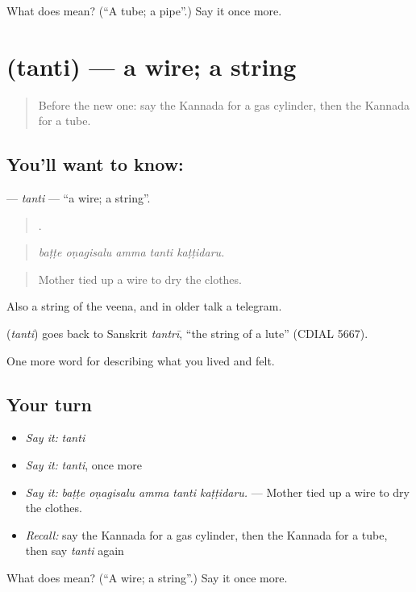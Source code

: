 \begin{tcolorbox}[breakable,colback=teal!4,colframe=teal!35!black,title={Before you move on}]
What does  mean? (\textquotedblleft{}A tube; a pipe\textquotedblright{}.) Say it once more.
\end{tcolorbox}
\section[\texorpdfstring{\kn{ತಂತಿ} (tanti)}{ತಂತಿ (tanti)}]{ (tanti) — a wire; a string}

\label{lesson:KA-C544-tanti}



\begin{quote}
Before the new one: say the Kannada for a gas cylinder, then the Kannada for a tube.
\end{quote}

\subsection*{You'll want to know: }
\textbf{} — \emph{tanti} — \textquotedblleft{}a wire; a string\textquotedblright{}.

\begin{quote}
    .
\end{quote}

\begin{quote}
\emph{baṭṭe oṇagisalu amma tanti kaṭṭidaru.}
\end{quote}

\begin{quote}
Mother tied up a wire to dry the clothes.
\end{quote}

Also a string of the veena, and in older talk a telegram.

\begin{cousinweb}
\textbf{} (\emph{tanti}) goes back to Sanskrit \emph{tantrī}, \textquotedblleft{}the string of a lute\textquotedblright{} (CDIAL 5667).
\end{cousinweb}

\begin{grammarlens}[title={What you've built}]
One more word for describing what you lived and felt.
\end{grammarlens}

\subsection*{Your turn}
\begin{itemize}
\raggedright
  \item \emph{Say it:} \emph{tanti}
  \item \emph{Say it:} \emph{tanti}, once more
  \item \emph{Say it:} \emph{baṭṭe oṇagisalu amma tanti kaṭṭidaru.} — Mother tied up a wire to dry the clothes.
  \item \emph{Recall:} say the Kannada for a gas cylinder, then the Kannada for a tube, then say \emph{tanti} again
\end{itemize}

\begin{tcolorbox}[breakable,colback=teal!4,colframe=teal!35!black,title={Before you move on}]
What does  mean? (\textquotedblleft{}A wire; a string\textquotedblright{}.) Say it once more.
\end{tcolorbox}
